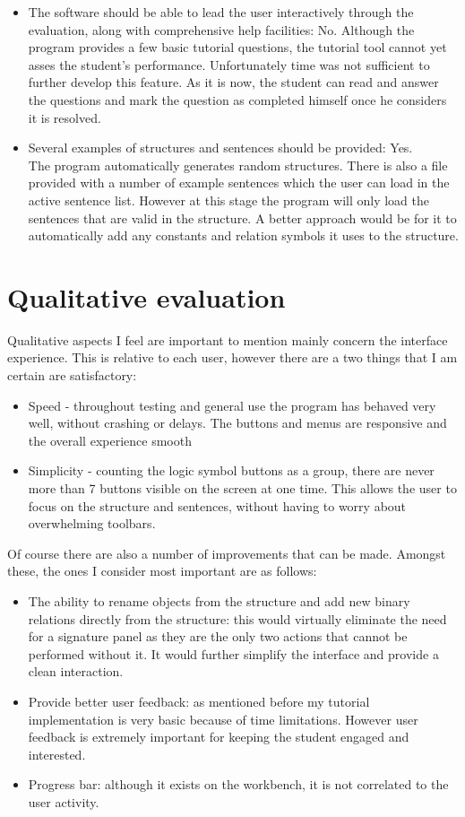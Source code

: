 \documentclass{report}
\begin{document}
\begin{itemize}
\item The software should be able to lead the user interactively through the 
evaluation, along with comprehensive help facilities: No.
Although the program provides a few basic tutorial questions, the tutorial tool 
cannot yet asses the student's performance. Unfortunately time was not 
sufficient to further develop this feature. As it is now, the student can read 
and answer the questions and mark the question as completed himself once he 
considers it is resolved. 

\item Several examples of structures and sentences should be provided: Yes.\\
The program automatically generates random structures. There is also a file 
provided with a number of example sentences which the user can load in the 
active sentence list. However at this stage the program will only load the 
sentences that are valid in the structure. A better approach would be for it to 
automatically add any constants and relation symbols it uses to the structure. 
\end{itemize}

\section{Qualitative evaluation}
Qualitative aspects I feel are important to mention mainly concern the interface 
experience. This is relative to each user, however there are a two things that I 
am certain are satisfactory:
\begin{itemize}
\item Speed - throughout testing and general use the program has behaved very 
well, without crashing or delays. The buttons and menus are responsive and the 
overall experience smooth
\item Simplicity - counting the logic symbol buttons as a group, there are never 
more than 7 buttons visible on the screen at one time. This allows the user to 
focus on the structure and sentences, without having to worry about overwhelming 
toolbars. 
\end{itemize}

Of course there are also a number of improvements that can be made. Amongst 
these, the ones I consider most important are as follows:

\begin{itemize}
\item The ability to rename objects from the structure and add new binary 
relations directly from the structure: this would virtually eliminate the need 
for a signature panel as they are the only two actions that cannot be performed 
without it. It would further simplify the interface and provide a clean 
interaction.
\item Provide better user feedback: as mentioned before my tutorial 
implementation is very basic because of time limitations. However user 
feedback is extremely important for keeping the student engaged and interested.
\item Progress bar: although it exists on the workbench, it is not correlated 
to the user activity. 
\end{itemize}
\end{document}

